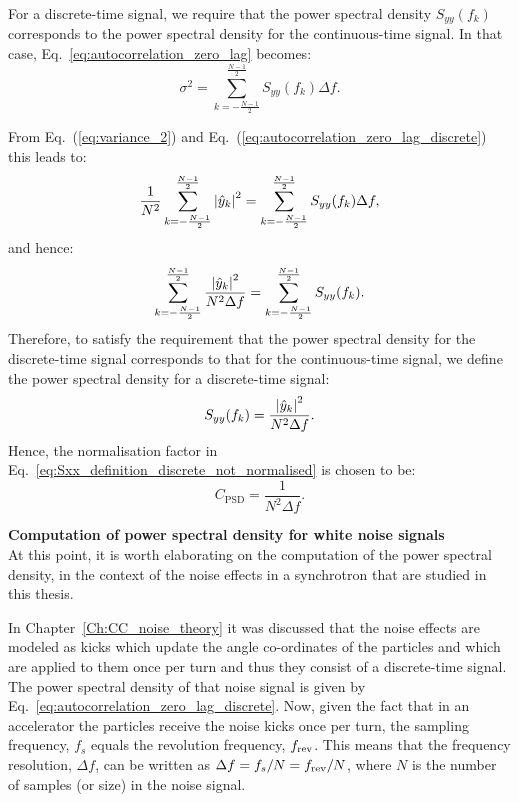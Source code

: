 For a discrete-time signal, we require that the power spectral density $S_{yy}(f_k)$ corresponds to the power spectral density for the continuous-time signal. In that case, Eq.~\eqref{eq:autocorrelation_zero_lag}
becomes:
\begin{equation}\label{eq:autocorrelation_zero_lag_discrete}
\sigma^2 =  \sum_{k=-\frac{N-1}{2}}^{\frac{N-1}{2}} S_{yy}(f_k) \Delta f.
\end{equation}

From Eq.~(\ref{eq:variance_2}) and Eq.~(\ref{eq:autocorrelation_zero_lag_discrete}) this leads to:
\begin{equation}\label{eq:normalisation_test}
 \frac{1}{N^2}\sum_{k=-\frac{N-1}{2}}^{\frac{N-1}{2}} \left | \hat{y}_k \right |^2 =  \sum_{k=-\frac{N-1}{2}}^{\frac{N-1}{2}} S_{yy}(f_k) \Delta f,
\end{equation} %
and hence:
\begin{equation}
  \sum_{k=-\frac{N-1}{2}}^{\frac{N-1}{2}} \frac{\left | \hat{y}_k \right |^2}{N^2 \Delta f} =  \sum_{k=-\frac{N-1}{2}}^{\frac{N-1}{2}} S_{yy}(f_k).
\end{equation}
Therefore, to satisfy the requirement that the power spectral density for the discrete-time signal corresponds to that for the continuous-time signal, we define the power spectral density for a discrete-time signal:
\begin{equation}
    S_{yy}(f_k) = \frac{\left | \hat{y}_k \right |^2}{N^2 \Delta f}.
\end{equation}
Hence, the normalisation factor in Eq.~\eqref{eq:Sxx_definition_discrete_not_normalised} is chosen to be:
\begin{equation}
    C_\mathrm{PSD}=\frac{1}{N^2 \Delta f}.
\end{equation}

\textbf{Computation of power spectral density for white noise signals}\\
At this point, it is worth elaborating on the computation of the power spectral density, in the context of the noise effects in a synchrotron that are studied in this thesis.

In Chapter~\ref{Ch:CC_noise_theory} it was discussed that the noise effects are modeled as kicks which update the angle co-ordinates of the particles and which are applied to them once per turn and thus they consist of a discrete-time signal. The power spectral density of that noise signal is given by Eq.~\eqref{eq:autocorrelation_zero_lag_discrete}.  Now, given the fact that in an accelerator the particles receive the noise kicks once per turn, the sampling frequency, $f_s$ equals the revolution frequency, ${f_\mathrm{rev}}$. This means that the frequency resolution, $\Delta f$, can be written as $\Delta f = f_s/N = {f_\mathrm{rev}}/N$, where $N$ is the number of samples (or size) in the noise signal. 

